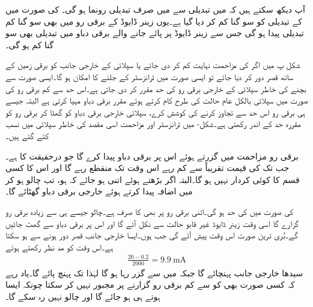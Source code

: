 آپ دیکھ سکتے ہیں کہ  میں  تبدیلی سے  میں صرف  تبدیلی رونما ہو گی۔ کی صورت میں  کے تبدیلی کو سو گنا کم کر دیا گیا ہے۔یوں زینر ڈایوڈ کے برقی رو میں بھی سو گنا کم تبدیلی پیدا ہو گی جس سے زینر ڈایوڈ پر پائے جانے والے برقی دباو میں تبدیلی بھی سو گنا کم ہو گی۔

شکل  پ میں اگر  کی مزاحمت نہایت کم کر دی جائے یا سپلائی کے خارجی جانب کو برقی زمین کے ساتھ قصر دور کر دیا جائے تو ایسی صورت میں ٹرانزسٹر کے جلنے کا امکان ہو گا۔ایسی صورت سے بچنے کی خاطر سپلائی کے خارجی برقی رو کی حد مقرر کر دی جاتی ہے۔اس حد سے کم برقی رو کی صورت میں سپلائی بالکل عام حالت کی طرح کام کرتے ہوئے مقرر برقی دباو مہیا کرتی ہے البتہ جیسے ہی برقی رو اس حد سے تجاوز کرنے کی کوشش کرے، سپلائی خارجی برقی دباو کو گھٹا کر برقی رو کو مقررہ حد کے اندر رکھتی ہے۔شکل- میں ٹرانزسٹر  اور مزاحمت  اسی مقصد کی خاطر سپلائی میں نسب کئے گئے ہیں۔

برقی رو مزاحمت  میں گزرتے ہوئے اس  پر  برقی دباو پیدا کرے گا جو درحقیقت  کا  ہے۔جب تک  کی قیمت تقریباً  سے کم رہے اس وقت تک  منقطع رہے گا اور اس کا کسی قسم کا کوئی کردار نہیں ہو گا۔البتہ اگر  بڑھتے ہوئے اتنی ہو جائے کہ  ہو، تب  چالو ہو کر  میں اضافہ پیدا کرتے ہوئے خارجی برقی دباو  گھٹائے گا۔

 کی صورت میں  کی حد  ہو گی۔اتنی برقی رو پر بھی  کا  صرف  ہے۔چالو  جیسے ہی  سے زیادہ برقی رو گزارے گا اسی وقت زینر ڈایوڈ غیر قابو حالت سے نکل آئے گا اور اس پر برقی دباو  سے گھٹ جائیں گے۔بُری ترین صورت اس وقت پیش آئے گی جب  ہوں۔ایسا خارجی جانب قصر دور ہونے سے ہو سکتا ہے۔اس وقت  کو مد نظر رکھتے ہوئے 
\begin{align*}
\frac{20-0.2}{2000}=\SI{9.9}{\milli \ampere}
\end{align*}
سیدھا خارجی جانب پہنچائے گا جبکہ   میں سے  گزر رہا ہو گا لہٰذا  تک پہنچ پائے گا۔یاد رہے کہ  کسی صورت بھی  کو  سے کم برقی رو گزارنے پر مجبور نہیں کر سکتا چونکہ ایسا ہوتے ہی   ہو جائے گا اور  چالو نہیں رہ سکے گا۔

